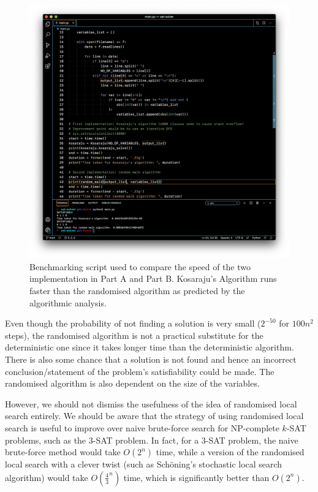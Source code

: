 \documentclass[11pt,fancychapters]{article}
\begin{document}
\begin{figure}[h]
\centering
\includegraphics[width=.95\textwidth]{diagrams/test0.png}
\caption{Benchmarking script used to compare the speed of the two implementation in Part A and Part B. Kosaraju's Algorithm runs faster than the randomised algorithm as predicted by the algorithmic analysis. }
\end{figure}

\vspace{4mm}

Even though the probability of not finding a solution is very small ($2^{-50}$ for $100n^2$ steps), the randomised algorithm is not a practical substitute for the deterministic one since it takes longer time than the deterministic algorithm. There is also some chance that a solution is not found and hence an incorrect conclusion/statement of the problem's satisfiability could be made. The randomised algorithm is also dependent on the size of the variables.\newline

However, we should not dismiss the usefulness of the idea of randomised local search entirely. We should be aware that the strategy of using randomised local search is useful to improve over naive brute-force search for NP-complete $k$-SAT problems, such as the $3$-SAT problem. In fact, for a 3-SAT problem, the naive brute-force method would take $O(2^n)$ time, while a version of the randomised local search with a clever twist (such as Sch\"{o}ning's stochastic local search algorithm) would take $O\left(\frac{4}{3}^n\right)$ time, which is significantly better than $O(2^n)$.
\end{document}
